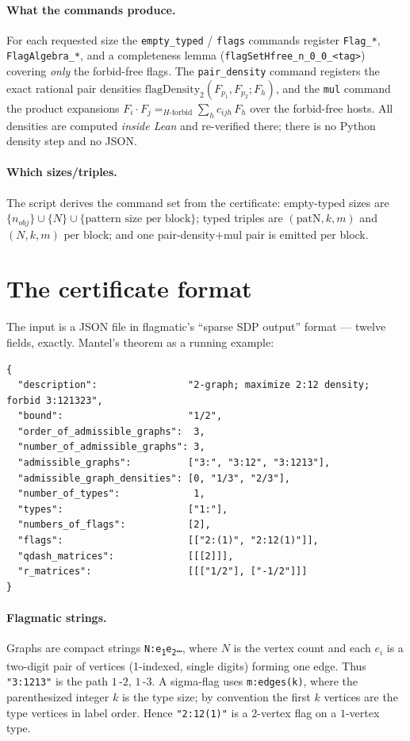\documentclass[11pt]{article}
\begin{document}
\paragraph{What the commands produce.}
For each requested size the \texttt{empty\_typed} / \texttt{flags} commands
register \texttt{Flag\_*}, \texttt{FlagAlgebra\_*}, and a completeness lemma
(\texttt{flagSetHfree\_n\_0\_0\_<tag>}) covering \emph{only} the forbid-free
flags. The \texttt{pair\_density} command registers the exact rational pair
densities $\mathrm{flagDensity}_2(F_{p_1},F_{p_2};F_h)$, and the \texttt{mul}
command the product expansions
$F_i \cdot F_j =_{H\text{-forbid}} \sum_h c_{ijh}\,F_h$ over the forbid-free
hosts. All densities are computed \emph{inside Lean} and re-verified there; there
is no Python density step and no JSON.

\paragraph{Which sizes/triples.}
The script derives the command set from the certificate:
empty-typed sizes are $\{n_{\mathit{obj}}\} \cup \{N\} \cup \{\text{pattern size
per block}\}$; typed triples are $(\text{patN},k,m)$ and $(N,k,m)$ per block; and
one pair-density${+}$mul pair is emitted per block.

\section{The certificate format}
\label{sec:format}

The input is a JSON file in flagmatic's ``sparse SDP output'' format --- twelve
fields, exactly. Mantel's theorem as a running example:
\begin{lstlisting}[language={}]
{
  "description":                "2-graph; maximize 2:12 density; forbid 3:121323",
  "bound":                      "1/2",
  "order_of_admissible_graphs":  3,
  "number_of_admissible_graphs": 3,
  "admissible_graphs":          ["3:", "3:12", "3:1213"],
  "admissible_graph_densities": [0, "1/3", "2/3"],
  "number_of_types":             1,
  "types":                      ["1:"],
  "numbers_of_flags":           [2],
  "flags":                      [["2:(1)", "2:12(1)"]],
  "qdash_matrices":             [[[2]]],
  "r_matrices":                 [[["1/2"], ["-1/2"]]]
}
\end{lstlisting}

\paragraph{Flagmatic strings.}
Graphs are compact strings \texttt{N:e\textsubscript{1}e\textsubscript{2}\ldots},
where $N$ is the vertex count and each $e_i$ is a two-digit pair of vertices
(1-indexed, single digits) forming one edge. Thus \texttt{"3:1213"} is the path
$1$\,-$2$, $1$\,-$3$. A sigma-flag uses \texttt{m:edges(k)}, where the
parenthesized integer $k$ is the type size; by convention the first $k$ vertices
are the type vertices in label order. Hence \texttt{"2:12(1)"} is a $2$-vertex
flag on a $1$-vertex type.
\end{document}
